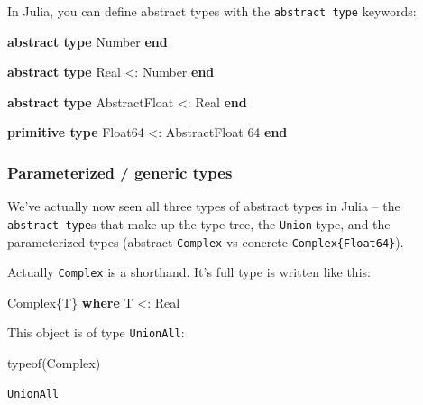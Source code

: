 \documentclass[
]{article}
\newenvironment{Shaded}{\begin{snugshade}}{\end{snugshade}}
\newcommand{\DataTypeTok}[1]{\textcolor[rgb]{0.68,0.00,0.00}{#1}}
\newcommand{\FloatTok}[1]{\textcolor[rgb]{0.68,0.00,0.00}{#1}}
\newcommand{\FunctionTok}[1]{\textcolor[rgb]{0.28,0.35,0.67}{#1}}
\newcommand{\KeywordTok}[1]{\textcolor[rgb]{0.00,0.23,0.31}{\textbf{#1}}}
\newcommand{\NormalTok}[1]{\textcolor[rgb]{0.00,0.23,0.31}{#1}}
\newcommand{\OperatorTok}[1]{\textcolor[rgb]{0.37,0.37,0.37}{#1}}
\begin{document}
In Julia, you can define abstract types with the \texttt{abstract\ type}
keywords:

\begin{Shaded}
\begin{Highlighting}[]
\KeywordTok{abstract type} \DataTypeTok{Number}
\KeywordTok{end}

\KeywordTok{abstract type} \DataTypeTok{Real} \OperatorTok{\textless{}:}\DataTypeTok{ Number}
\KeywordTok{end}

\KeywordTok{abstract type} \DataTypeTok{AbstractFloat} \OperatorTok{\textless{}:}\DataTypeTok{ Real}
\KeywordTok{end}

\KeywordTok{primitive type} \DataTypeTok{Float64} \OperatorTok{\textless{}:}\DataTypeTok{ AbstractFloat}
   \FloatTok{64}
\KeywordTok{end}
\end{Highlighting}
\end{Shaded}

\subsubsection{Parameterized / generic
types}\label{parameterized-generic-types}

We've actually now seen all three types of abstract types in Julia --
the \texttt{abstract\ type}s that make up the type tree, the
\texttt{Union} type, and the parameterized types (abstract
\texttt{Complex} vs concrete \texttt{Complex\{Float64\}}).

Actually \texttt{Complex} is a shorthand. It's full type is written like
this:

\begin{Shaded}
\begin{Highlighting}[]
\DataTypeTok{Complex}\NormalTok{\{T\} }\KeywordTok{where}\NormalTok{ T }\OperatorTok{\textless{}:}\DataTypeTok{ Real}
\end{Highlighting}
\end{Shaded}

This object is of type \texttt{UnionAll}:

\begin{Shaded}
\begin{Highlighting}[]
\FunctionTok{typeof}\NormalTok{(}\DataTypeTok{Complex}\NormalTok{)}
\end{Highlighting}
\end{Shaded}

\begin{verbatim}
UnionAll
\end{verbatim}
\end{document}
